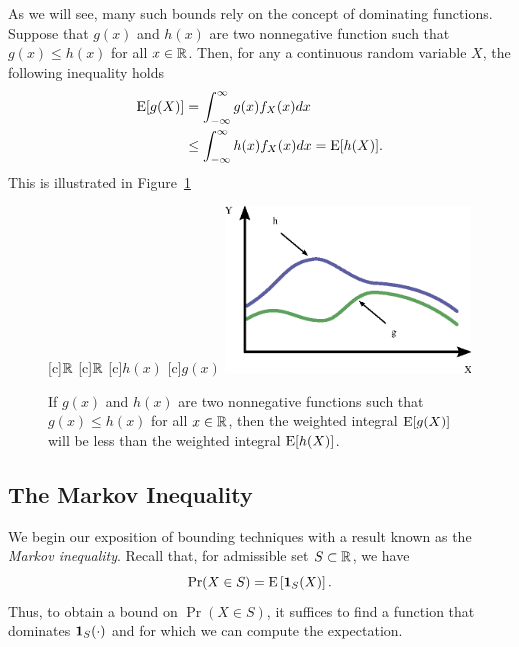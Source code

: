 As we will see, many such bounds rely on the concept of dominating functions.
Suppose that $g(x)$ and $h(x)$ are two nonnegative function such that $g(x) \leq h(x)$ for all $x \in \mathbb{R}$.
Then, for any a continuous random variable $X$, the following inequality holds
\begin{equation*}
\begin{split}
\mathrm{E} [g(X)] &= \int_{-\infty}^{\infty} g(x) f_X(x) dx \\
&\leq \int_{-\infty}^{\infty} h(x) f_X (x) dx
= \mathrm{E} [h(X)] .
\end{split}
\end{equation*}
This is illustrated in Figure~\ref{figure:DominatingFcn}
\begin{figure}[thb]
\begin{center}
\begin{psfrags}
[c]{$\mathbb{R}$}
[c]{$\mathbb{R}$}
[c]{$h(x)$}
[c]{$g(x)$}
\includegraphics[width=6.5cm]{Figures/10Chapter/DominatingFcn}
\end{psfrags}
\caption{If $g(x)$ and $h(x)$ are two nonnegative functions such that $g(x) \leq h(x)$ for all $x \in \mathbb{R}$, then the weighted integral $\mathrm{E} [g (X)]$ will be less than the weighted integral $\mathrm{E} [h(X)]$.}
\label{figure:DominatingFcn}
\end{center}
\end{figure}

\subsection{The Markov Inequality}

We begin our exposition of bounding techniques with a result known as the \emph{Markov inequality}. 
Recall that, for admissible set $S \subset \mathbb{R}$, we have
\begin{equation*}
\Pr (X \in S) = \mathrm{E} \left[ \mathbf{1}_S (X) \right] .
\end{equation*}
Thus, to obtain a bound on $\Pr (X \in S)$, it suffices to find a function that dominates $\mathbf{1}_S (\cdot)$ and for which we can compute the expectation.


